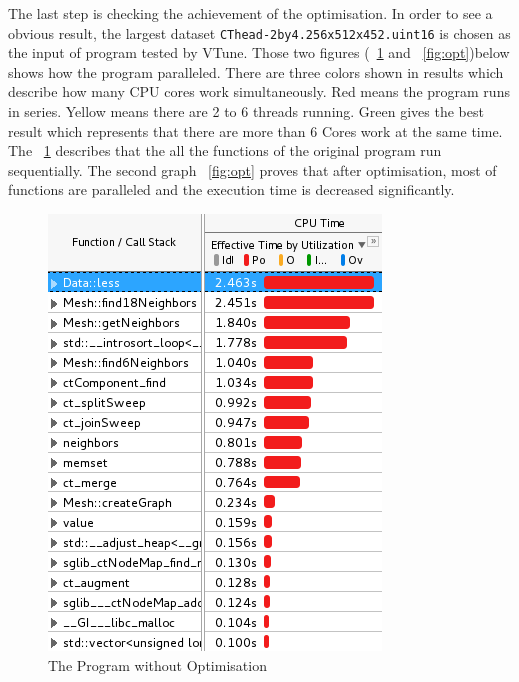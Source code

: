 \documentclass[conference]{IEEEtran}
\newcommand{\fref}[1]{\figurename~\ref{#1}}
\begin{document}
The last step is checking the achievement of the optimisation. In order to see a obvious result, the largest dataset \texttt{CThead-2by4.256x512x452.uint16} is chosen as the input of program tested by VTune. Those two figures (\fref{fig:noopt} and \fref{fig:opt})below shows how the program  paralleled. There are three colors shown in results which describe how many CPU cores work simultaneously. Red means the program runs in series. Yellow means there are 2 to 6 threads running. Green gives the best result which represents that there are more than 6 Cores work at the same time. The \fref{fig:noopt} describes that the all the functions of the original program run sequentially. The second graph \fref{fig:opt} proves that after optimisation, most of functions are paralleled and the execution time is decreased significantly. 
\begin{figure}[!h]
    \centering
    \includegraphics[width=\columnwidth]{noopt_vtune}
    \caption{The Program without Optimisation}
    \label{fig:noopt}
\end{figure}
\end{document}
